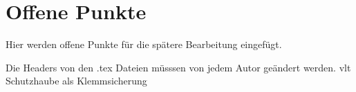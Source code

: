 

\chapter{Offene Punkte}
 Hier werden offene Punkte für die spätere Bearbeitung eingefügt. 

 Die Headers von den .tex Dateien müsssen von jedem Autor geändert werden.
 vlt Schutzhaube als Klemmsicherung




